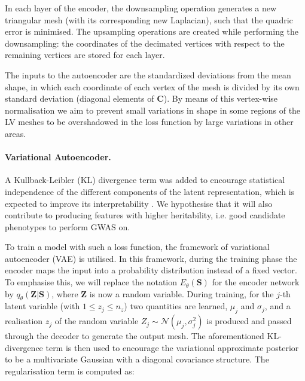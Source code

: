 In each layer of the encoder, the downsampling operation generates a new triangular mesh (with its corresponding new Laplacian), such that the quadric error is minimised. The upsampling operations are created while performing the downsampling: the coordinates of the decimated vertices with respect to the remaining vertices are stored for each layer. 

The inputs to the autoencoder are the standardized deviations from the mean shape, in which each coordinate of each vertex of the mesh is divided by its own standard deviation (diagonal elements of $\textbf{C}$). By means of this vertex-wise normalisation we aim to prevent small variations in shape in some regions of the LV meshes to be overshadowed in the loss function by large variations in other areas. %

\paragraph{Variational Autoencoder.} A Kullback-Leibler (KL) divergence term was added to encourage statistical independence of the different components of the latent representation, which is expected to improve its interpretability \cite{ref_betavae}. We hypothesise that it will also contribute to producing features with higher heritability, i.e. good candidate phenotypes to perform GWAS on.

To train a model with such a loss function, the framework of variational autoencoder (VAE) is utilised. In this framework, during the training phase the encoder maps the input into a probability distribution instead of a fixed vector. To emphasise this, we will replace the notation $E_\theta(\textbf{S})$ for the encoder network by $q_{\theta}(\textbf{Z}|\textbf{S})$, where $\textbf{Z}$ is now a random variable. During training, for the $j$-th latent variable (with $1\leq z_j\leq n_z$) two quantities are learned, $\mu_j$ and $\sigma_j$, and a realisation $z_j$ of the random variable $Z_j\sim\mathcal{N}(\mu_j, \sigma^2_j)$ is produced and passed through the decoder to generate the output mesh. The aforementioned KL-divergence term is then used to encourage the variational approximate posterior to be a multivariate Gaussian with a diagonal covariance structure. The regularisation term is computed as:

